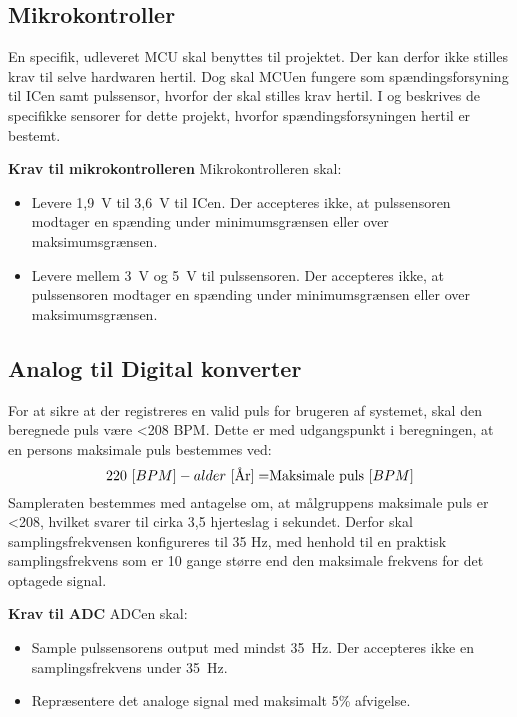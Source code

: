 \subsection{Mikrokontroller} \label{krav_mikro_spaending}
En specifik, udleveret MCU skal benyttes til projektet. Der kan derfor ikke stilles krav til selve hardwaren hertil. Dog skal MCUen fungere som spændingsforsyning til ICen samt pulssensor, hvorfor der skal stilles krav hertil. I  og  beskrives de specifikke sensorer for dette projekt, hvorfor spændingsforsyningen hertil er bestemt.

\textbf{Krav til mikrokontrolleren} \newline 
Mikrokontrolleren skal:
\begin{itemize}
	\item Levere 1,9~V til 3,6~V til ICen. Der accepteres ikke, at pulssensoren modtager en spænding under minimumsgrænsen eller over maksimumsgrænsen.
	\item Levere mellem 3~V og 5~V til pulssensoren. Der accepteres ikke, at pulssensoren modtager en spænding under minimumsgrænsen eller over maksimumsgrænsen.
\end{itemize}

\subsection{Analog til Digital konverter} \label{krav_adc}
For at sikre at der registreres en valid puls for brugeren af systemet, skal den beregnede puls være <208 BPM. Dette er med udgangspunkt i beregningen, at en persons maksimale puls bestemmes ved: \citep{CooperBlair2005} 
\begin{equation}
220~[BPM] - alder~[$År$] = $Maksimale puls$~[BPM]
\end{equation}
Sampleraten bestemmes med antagelse om, at målgruppens maksimale puls er <208, hvilket svarer til cirka 3,5 hjerteslag i sekundet. Derfor skal samplingsfrekvensen konfigureres til 35 Hz, med henhold til en praktisk samplingsfrekvens som er 10 gange større end den maksimale frekvens for det optagede signal. \citep{Webster2011}

\textbf{Krav til ADC} \newline
ADCen skal:
\begin{itemize}
	\item Sample pulssensorens output med mindst 35~Hz. Der accepteres ikke en samplingsfrekvens under 35~Hz. 
	\item Repræsentere det analoge signal med maksimalt 5\% afvigelse. 
\end{itemize}

